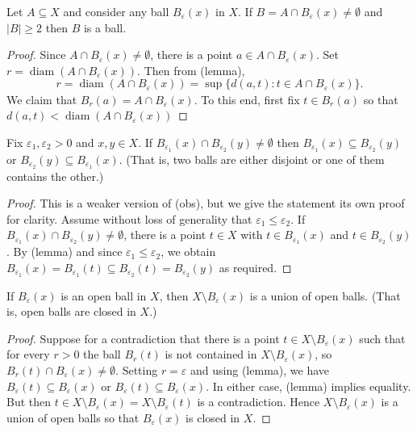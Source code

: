 \begin{lemma}
Let \( A \subseteq X \) and consider any ball \( B_{\varepsilon } (x) \) in \( X \). If \(B = A \cap B_{\varepsilon } (x) \neq \emptyset  \) and \( |B| \geq 2 \) then \( B \) is a ball.
\end{lemma}
\begin{proof}
	Since \( A \cap B_{\varepsilon } (x) \neq \emptyset  \), there is a point \( a \in A \cap B_{\varepsilon } (x) \). Set \( r = \operatorname{diam}  (A \cap B_{\varepsilon } (x)) \). Then from (lemma), \[ r = \operatorname{diam} (A \cap B_{\varepsilon } (x)) =  \sup_{} \{ d(a,t) : t \in A \cap B_{\varepsilon } (x)\}. \] We claim that \( B_{r} (a) = A \cap B_{\varepsilon } (x) \). To this end, first fix \( t \in B_{r} (a) \) so that \( d(a, t) < \operatorname{diam}  (A \cap B_{\varepsilon } (x)) \) 
\end{proof}
\begin{lemma}
Fix \( \varepsilon_1, \varepsilon_2 > 0 \) and \( x, y \in X \). If \( B_{\varepsilon_1} (x) \cap B_{\varepsilon_2}(y) \neq \emptyset  \) then \( B_{\varepsilon_1} (x) \subseteq B_{\varepsilon_2} (y) \) or \( B_{\varepsilon_{2} }(y) \subseteq B_{\varepsilon_1} (x)  \). (That is, two balls are either disjoint or one of them contains the other.)
\end{lemma}
\begin{proof}
This is a weaker version of (obs), but we give the statement its own proof for clarity. Assume without loss of generality that \( \varepsilon_1 \leq \varepsilon_2 \). If \( B_{\varepsilon_1} (x) \cap B_{\varepsilon_2} (y) \neq \emptyset \), there is a point \( t \in X \) with \( t \in B_{\varepsilon_1}(x) \) and \( t \in  B_{\varepsilon_2} (y)  \). By (lemma) and since \( \varepsilon_1 \leq \varepsilon_2 \), we obtain \( B_{\varepsilon_1} (x) = B_{\varepsilon_1} (t) \subseteq B_{\varepsilon_2} (t) = B_{\varepsilon_2} (y) \) as required.
\end{proof}
\begin{lemma}
If \( B_{\varepsilon } (x) \) is an open ball in \( X \), then \( X \setminus  B_{\varepsilon } (x) \) is a union of open balls. (That is, open balls are closed in \( X \).)
\end{lemma}
\begin{proof}
Suppose for a contradiction that there is a point \( t \in X \setminus B_{\varepsilon} (x) \) such that for every \( r > 0 \) the ball \( B_{r}(t) \) is not contained in \( X \setminus B_{\varepsilon } (x) \), so \( B_{r} (t) \cap B_{\varepsilon} (x) \neq \emptyset \). Setting \( r = \varepsilon  \) and using (lemma), we have \( B_{\varepsilon} (t) \subseteq B_{\varepsilon } (x) \) or \( B_{\varepsilon} (t) \subseteq B_{\varepsilon} (x) \). In either case, (lemma) implies equality. But then \( t \in X \setminus B_{\varepsilon } (x) = X \setminus B_{\varepsilon } (t) \) is a contradiction. Hence \( X \setminus B_{\varepsilon } (x) \) is a union of open balls so that \( B_{\varepsilon } (x) \) is closed in \( X \).
\end{proof}
